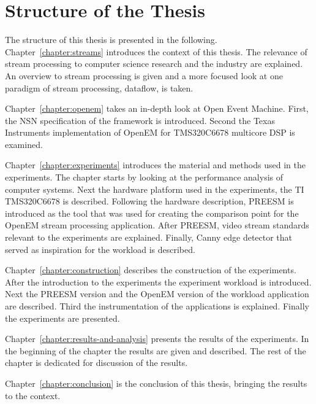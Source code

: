 \section{Structure of the Thesis}
\label{section:structure}
The structure of this thesis is presented in the following. Chapter~\ref{chapter:streams} introduces the context of this thesis. The relevance of stream processing to computer science research and the industry are explained. An overview to stream processing is given and a more focused look at one paradigm of stream processing, dataflow, is taken.

Chapter~\ref{chapter:openem} takes an in-depth look at Open Event Machine. First, the NSN specification of the framework is introduced. Second the Texas Instruments implementation of OpenEM for TMS320C6678 multicore DSP is examined.

Chapter~\ref{chapter:experiments} introduces the material and methods used in the experiments. The chapter starts by looking at the performance analysis of computer systems. Next the hardware platform used in the experiments, the TI TMS320C6678 is described. Following the hardware description, PREESM is introduced as the tool that was used for creating the comparison point for the OpenEM stream processing application. After PREESM, video stream standards relevant to the experiments are explained. Finally, Canny edge detector that served as inspiration for the workload is described.

Chapter~\ref{chapter:construction} describes the construction of the experiments. After the introduction to the experiments the experiment workload is introduced. Next the PREESM version and the OpenEM version of the workload application are described. Third the instrumentation of the applications is explained. Finally the experiments are presented.

Chapter~\ref{chapter:results-and-analysis} presents the results of the experiments. In the beginning of the chapter the results are given and described. The rest of the chapter is dedicated for discussion of the results.

Chapter~\ref{chapter:conclusion} is the conclusion of this thesis, bringing the results to the context.
